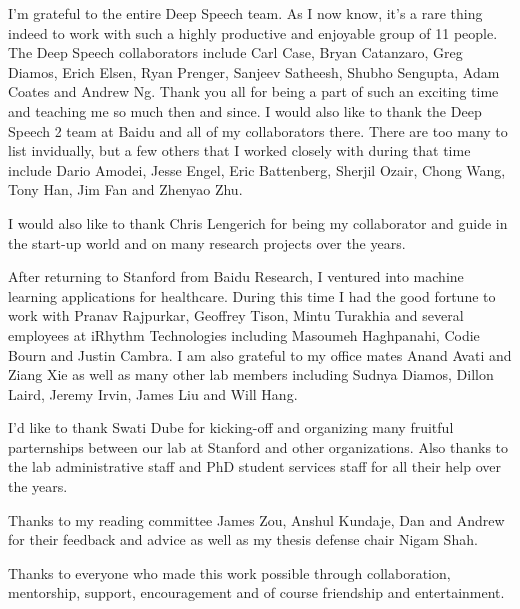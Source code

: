 I'm grateful to the entire Deep Speech team. As I now know, it's a rare thing
indeed to work with such a highly productive and enjoyable group of 11 people.
The Deep Speech collaborators include Carl Case, Bryan Catanzaro, Greg Diamos,
Erich Elsen, Ryan Prenger, Sanjeev Satheesh, Shubho Sengupta, Adam Coates and
Andrew Ng. Thank you all for being a part of such an exciting time and teaching
me so much then and since. I would also like to thank the Deep Speech 2 team at
Baidu and all of my collaborators there. There are too many to list invidually,
but a few others that I worked closely with during that time include Dario
Amodei, Jesse Engel, Eric Battenberg, Sherjil Ozair, Chong Wang, Tony Han, Jim
Fan and Zhenyao Zhu.

I would also like to thank Chris Lengerich for being my collaborator and guide
in the start-up world and on many research projects over the years.

After returning to Stanford from Baidu Research, I ventured into machine
learning applications for healthcare. During this time I had the good fortune
to work with Pranav Rajpurkar, Geoffrey Tison, Mintu Turakhia and several
employees at iRhythm Technologies including Masoumeh Haghpanahi, Codie Bourn
and Justin Cambra. I am also grateful to my office mates Anand Avati and Ziang
Xie as well as many other lab members including Sudnya Diamos, Dillon Laird,
Jeremy Irvin, James Liu and Will Hang.

I'd like to thank Swati Dube for kicking-off and organizing many fruitful
parternships between our lab at Stanford and other organizations. Also thanks
to the lab administrative staff and PhD student services staff for all their
help over the years.

Thanks to my reading committee James Zou, Anshul Kundaje, Dan and Andrew for
their feedback and advice as well as my thesis defense chair Nigam Shah.

Thanks to everyone who made this work possible through collaboration,
mentorship, support, encouragement and of course friendship and entertainment.

\afterpreface

